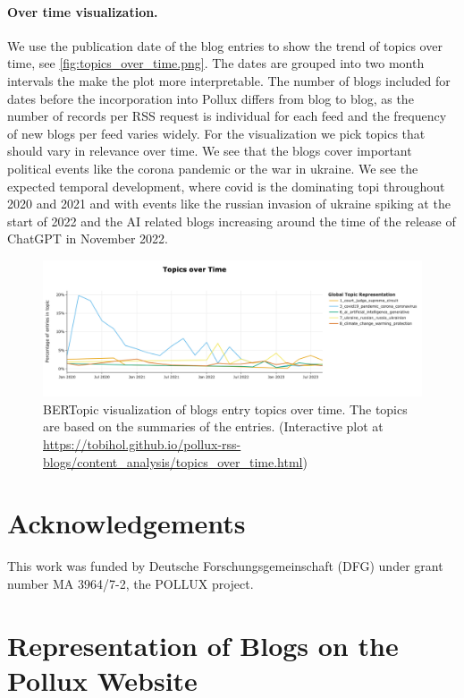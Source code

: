 \documentclass{article}
\begin{document}
\paragraph{Over time visualization.}
We use the publication date of the blog entries to show the trend of topics over time, see \autoref{fig:topics_over_time.png}. The dates are grouped into two month intervals the make the plot more interpretable. The number of blogs included for dates before the incorporation into Pollux differs from blog to blog, as the number of records per RSS request is individual for each feed and the frequency of new blogs per feed varies widely. For the visualization we pick topics that should vary in relevance over time. We see that the blogs cover important political events like the corona pandemic or the war in ukraine. We see the expected temporal development, where covid is the dominating topi throughout 2020 and 2021 and with events like the russian invasion of ukraine spiking at the start of 2022 and the AI related blogs increasing around the time of the release of ChatGPT in November 2022.

\begin{figure}[!htb]
    \includegraphics[width=1.0\textwidth]{figures/topics_over_time.png}
    \caption{BERTopic visualization of blogs entry topics over time. The topics are based on the summaries of the entries. (Interactive plot at \url{https://tobihol.github.io/pollux-rss-blogs/content_analysis/topics_over_time.html})}
    \label{fig:topics_over_time.png}
\end{figure}

\section*{Acknowledgements}
This work was funded by Deutsche Forschungsgemeinschaft (DFG) under grant number MA 3964/7-2, the POLLUX project.





\appendix
\section{Representation of Blogs on the Pollux Website}\label{appendix:website}
\end{document}

